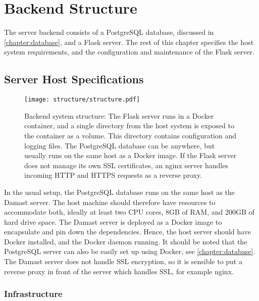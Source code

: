 \chapter{Backend Structure}
\label{chapter:backend}

The server backend consists of a PostgreSQL database, discussed in \cref{chapter:database}, and a Flask server.
The rest of this chapter specifies the host system requirements, and the configuration and maintenance of the Flask server.

\section{Server Host Specifications}

\begin{figure}[tb]
  \centering
  \texttt{[image: structure/structure.pdf]}
  \caption{%
    Backend system structure:
    The Flask server runs in a Docker container, and a single directory from the host system is exposed to the container as a volume.
    This directory contains configuration and logging files.
    The PostgreSQL database can be anywhere, but usually runs on the same host as a Docker image.
    If the Flask server does not manage its own SSL certificates, an nginx server handles incoming HTTP and HTTPS requests as a reverse proxy.
  }
  \label{fig:structure}
\end{figure}

In the usual setup, the PostgreSQL database runs on the same host as the Damast server.
The host machine should therefore have resources to accommodate both, ideally at least two CPU cores, 8GB of RAM, and 200GB of hard drive space.
The Damast server is deployed as a Docker image to encapsulate and pin down the dependencies.
Hence, the host server should have Docker installed, and the Docker daemon running.
It should be noted that the PostgreSQL server can also be easily set up using Docker, see \cref{chapter:database}.
The Damast server does not handle SSL encryption, so it is sensible to put a reverse proxy in front of the server which handles SSL, for example nginx.

\subsection{Infrastructure}

